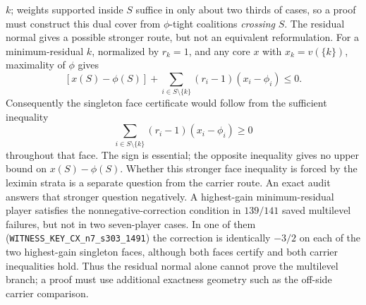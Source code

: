 $k$; weights supported inside $S$ suffice in only about two thirds of cases, so
a proof must construct this dual cover from $\phi$-tight coalitions
\emph{crossing} $S$.  The residual normal gives a possible stronger route, but
not an equivalent reformulation.  For a minimum-residual $k$, normalized by
$r_k=1$, and any core $x$ with $x_k=v(\{k\})$, maximality of $\phi$ gives
\[
 [x(S)-\phi(S)]
 +\sum_{i\in S\setminus\{k\}}(r_i-1)(x_i-\phi_i)\leq0.
\]
Consequently the singleton face certificate would follow from the sufficient
inequality
\[
 \sum_{i\in S\setminus\{k\}}(r_i-1)(x_i-\phi_i)\geq0
\]
throughout that face.  The sign is essential; the opposite inequality gives
no upper bound on $x(S)-\phi(S)$.  Whether this stronger face inequality is
forced by the leximin strata is a separate question from the carrier route.
An exact audit answers that stronger question negatively.  A highest-gain
minimum-residual player satisfies the nonnegative-correction condition in
$139/141$ saved multilevel failures, but not in two seven-player cases.  In
one of them
(\texttt{WITNESS\_KEY\_CX\_n7\_s303\_1491}) the correction is identically
$-3/2$ on each of the two highest-gain singleton faces, although both faces
certify and both carrier inequalities hold.  Thus the residual normal alone
cannot prove the multilevel branch; a proof must use additional exactness
geometry such as the off-side carrier comparison.

